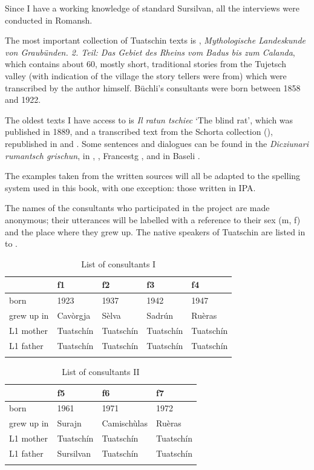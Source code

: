 Since I have a working knowledge of standard Sursilvan, all the interviews were conducted in Romansh.

The most important collection of Tuatschin texts is \citet{Büchli1966}, \textit{Mythologische Landeskunde von Graubünden. 2. Teil: Das Gebiet des Rheins vom Badus bis zum Calanda}, which contains about 60, mostly short, traditional stories from the Tujetsch valley (with indication of the village the story tellers were from) which were transcribed by the author himself. Büchli's consultants were born between 1858 and 1922.

The oldest texts I have access to is \textit{Il ratun tschiec} `The blind rat', which was published in 1889, and a transcribed text from the Schorta collection  (\citet{Schorta1926}), republished in \citet{Valär2013a} and \citet{Valär2013b}. Some sentences and dialogues can be found in the \textit{Dicziunari rumantsch grischun}, in \citet{Gartner1910}, \citet{Gadola1935}, Francestg \citet{Berther1998}, and in Baseli \citet{Berther2007}. 

The examples taken from the written sources will all be adapted to the spelling system used in this book, with one exception: those written in IPA.
  
The names of the consultants who participated in the project are made anonymous; their utterances will be labelled with a reference to their sex (m, f) and the place where they grew up. The native speakers of Tuatschin are listed in  to .

\begin{table}
	\caption{List of consultants I}
	\label{tab:consultantsI}
	\begin{tabular}{lllll}
		\lsptoprule
		& f1 & f2 & f3 & f4\\
		\midrule
		born & 1923 & 1937 & 1942 & 1947\\
		grew up in & Cavòrgja & Sèlva & Sadrún & Ruèras \\
		L1 mother & Tuatschín & Tuatschín & Tuatschín & Tuatschín \\
		L1 father & Tuatschín & Tuatschín & Tuatschín & Tuatschín \\
		\lspbottomrule
	\end{tabular}
\end{table}

\begin{table}
	\caption{List of consultants II}
	\label{tab:consultantsII}
	\begin{tabular}{llll}
		\lsptoprule
		& f5 & f6 & f7 \\
		\midrule
		born &  1961 & 1971 & 1972 \\
		grew up in &  Surajn &  Camischùlas &  Ruèras  \\
		L1 mother & Tuatschín & Tuatschín & Tuatschín\\
		L1 father & Sursilvan & Tuatschín & Tuatschín\\
		\lspbottomrule
	\end{tabular}
\end{table}

